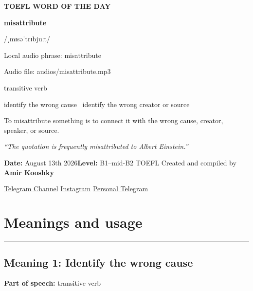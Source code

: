 \documentclass[11pt]{article}
\newcommand{\sectionrule}{\par\vspace{-0.5em}\noindent\textcolor{Accent}{\rule{\linewidth}{0.6pt}}\par}
\begin{document}
\begin{center}
{\sffamily\bfseries\color{Accent} TOEFL WORD OF THE DAY\par}
\vspace{8mm}
{\fontsize{42}{48}\selectfont\bfseries misattribute\par}
\vspace{2mm}
{\Large\sffamily\color{Accent} /ˌmɪsəˈtrɪbjuːt/\par}
\vspace{2mm}
{\small\sffamily Local audio phrase: misattribute\par}
{\small\sffamily Audio file: audios/misattribute.mp3\par}
\vspace{2mm}
{\large\sffamily\color{Muted} transitive verb\par}
\vspace{5mm}
{\sffamily identify the wrong cause \textbullet\ identify the wrong creator or source\par}
\vspace{6mm}
{\large To misattribute something is to connect it with the wrong cause, creator, speaker, or source.\par}
\vspace{6mm}
\begin{minipage}{0.84\textwidth}
\itshape “The quotation is frequently misattributed to Albert Einstein.”
\end{minipage}\par
\vspace{10mm}
\textbf{Date:} August 13th 2026\quad\textbullet\quad \textbf{Level:} B1--mid-B2 TOEFL
\vfill
Created and compiled by \textbf{Amir Kooshky}\par
\vspace{2mm}
\href{https://t.me/KooshkyTOEFL}{Telegram Channel}\quad\textbullet\quad
\href{https://www.instagram.com/kooshkytoefl}{Instagram}\quad\textbullet\quad
\href{https://t.me/KooshkyTOEFL\_pv}{Personal Telegram}
\end{center}
\newpage
\tableofcontents
\newpage

\section{Meanings and usage}
\sectionrule
\subsection{Meaning 1: Identify the wrong cause}
\textbf{Part of speech:} transitive verb
\end{document}
